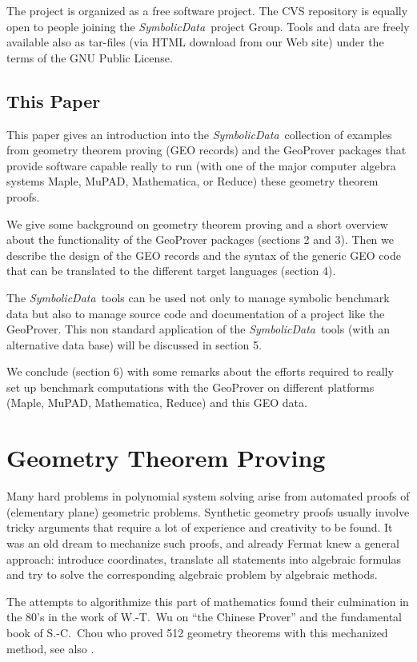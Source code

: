 \documentclass[11pt]{article}
\newcommand{\SD}{{\it Symbo\-lic\-Data}}
\begin{document}
The project is organized as a free software project. The CVS
repository is equally open to people joining the \SD\ project
Group. Tools and data are freely available also as tar-files (via
HTML download from our Web site) under the terms of the GNU
Public License.  

\subsection{This Paper}

This paper gives an introduction into the \SD\ collection of
examples from geometry theorem proving (GEO records) and the
GeoProver packages \cite{GeoProver} that provide software capable
really to run (with one of the major computer algebra systems
Maple, MuPAD, Mathematica, or Reduce) these geometry theorem
proofs.

We give some background on geometry theorem proving and a short
overview about the functionality of the GeoProver packages
(sections 2 and 3). Then we describe the design of the GEO
records and the syntax of the generic GEO code that can be
translated to the different target languages (section 4).

The \SD\ tools can be used not only to manage symbolic benchmark
data but also to manage source code and documentation of a
project like the GeoProver.  This non standard application of the
\SD\ tools (with an alternative data base) will be discussed in
section 5.

We conclude (section 6) with some remarks about the efforts
required to really set up benchmark computations with the
GeoProver on different platforms (Maple, MuPAD, Mathematica,
Reduce) and this GEO data.

\section{Geometry Theorem Proving}

Many hard problems in polynomial system solving arise from
automated proofs of (elementary plane) geometric problems.
Synthetic geometry proofs usually involve tricky arguments that
require a lot of experience and creativity to be found. It was an
old dream to mechanize such proofs, and already Fermat knew a
general approach: introduce coordinates, translate all statements
into algebraic formulas and try to solve the corresponding
algebraic problem by algebraic methods.

The attempts to algorithmize this part of mathematics found their
culmination in the 80's in the work of W.-T.~Wu
\cite{Books/Wu_94a} on ``the Chinese Prover'' and the fundamental
book \cite{Books/Chou_88a} of S.-C.~Chou who proved 512 geometry
theorems with this mechanized method, see also \cite{Chou_84a,
Chou_90a, Wu_84a, Wu_84b}.
\end{document}
